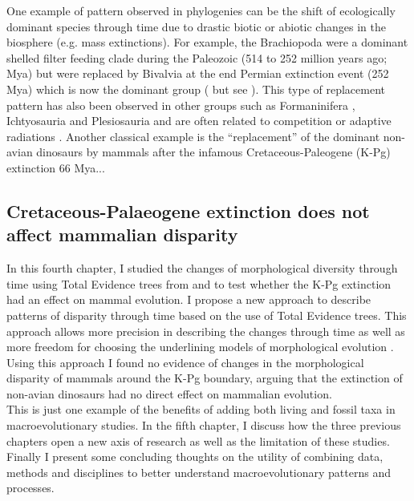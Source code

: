 One example of pattern observed in phylogenies can be the shift of ecologically dominant species through time due to drastic biotic or abiotic changes in the biosphere (e.g. mass extinctions).
For example, the Brachiopoda were a dominant shelled filter feeding clade during the Paleozoic (514 to 252 million years ago; Mya) but were replaced by Bivalvia at the end Permian extinction event (252 Mya) which is now the dominant group (\citealt{Sepkiski1981,CLAPHAM01102006} but see \citealt{Payne22052014}).
This type of replacement pattern has also been observed in other groups such as Formaninifera \citep{Coxall01042006}, Ichtyosauria \citep{thorneresetting2011} and Plesiosauria \citealt{bensonfaunal2014} and are often related to competition \citep{brusatte50} or adaptive radiations \citep{Losos2010}.
Another classical example is the ``replacement'' of the dominant non-avian dinosaurs by mammals after the infamous Cretaceous-Paleogene (K-Pg) extinction 66 Mya...

\subsection{Cretaceous-Palaeogene extinction does not affect mammalian disparity}
In this fourth chapter, I studied the changes of morphological diversity \citep[or disparity;][]{Wills1994} through time using Total Evidence trees from \cite{slaterphylogenetic2013} and \cite{beckancient2014} to test whether the K-Pg extinction had an effect on mammal evolution.
I propose a new approach to describe patterns of disparity through time based on the use of Total Evidence trees.
This approach allows more precision in describing the changes through time as well as more freedom for choosing the underlining models of morphological evolution \citep[e.g. punctuated or gradual;][]{Hunt21042015}.
Using this approach I found no evidence of changes in the morphological disparity of mammals around the K-Pg boundary, arguing that the extinction of non-avian dinosaurs had no direct effect on mammalian evolution.\\

This is just one example of the benefits of adding both living and fossil taxa in macroevolutionary studies.
In the fifth chapter, I discuss how the three previous chapters open a new axis of research %
as well as the limitation of these studies.
Finally I present some concluding thoughts on the utility of combining data, methods and disciplines to better understand macroevolutionary patterns and processes.

%